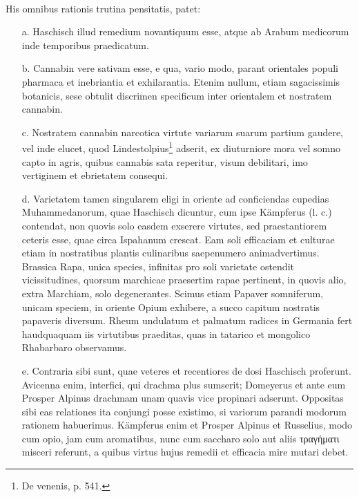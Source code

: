 \documentclass[a4paper, 11pt, oneside, polutonikogreek, german]{article}
\begin{document}
\paragraph{}
His omnibus rationis trutina pensitatis, patet:
\begin{itemize}
    \item[a.] Haschisch illud remedium novantiquum esse, atque ab Arabum medicorum inde temporibus praedicatum.

    \item[b.] Cannabin vere sativam esse, e qua, vario modo, parant orientales populi pharmaca et inebriantia et exhilarantia. Etenim nullum, etiam sagacissimis botanicis, sese obtulit discrimen specificum inter orientalem et nostratem cannabin.

    \item[c.] Nostratem cannabin narcotica virtute variarum suarum partium gaudere, vel inde elucet, quod Lindestolpius\footnote{De venenis, p. 541.} adserit, ex diuturniore mora vel somno capto in agris, quibus cannabis sata reperitur, visum debilitari, imo vertiginem et ebrietatem consequi.

    \item[d.] Varietatem tamen singularem eligi in oriente ad conficiendas cupedias Muhammedanorum, quae Haschisch dicuntur, cum ipse Kämpferus (l. c.) contendat, non quovis solo easdem exserere virtutes, sed praestantiorem ceteris esse, quae circa Ispahanum crescat. Eam soli efficaciam et culturae etiam in nostratibus plantis culinaribus saepenumero animadvertimus. Brassica Rapa, unica species, infinitas pro soli varietate ostendit vicissitudines, quorsum marchicae praesertim rapae pertinent, in quovis alio, extra Marchiam, solo degenerantes. Scimus etiam Papaver somniferum, unicam speciem, in oriente Opium exhibere, a succo capitum nostratis papaveris diversum. Rheum undulatum et palmatum radices in Germania fert haudquaquam iis virtutibus praeditas, quas in tatarico et mongolico Rhabarbaro observamus.

    \item[e.] Contraria sibi sunt, quae veteres et recentiores de dosi Haschisch proferunt. Avicenna enim, interfici, qui drachma plus sumserit; Domeyerus et ante eum Prosper Alpinus drachmam unam quavis vice propinari adserunt. Oppositas sibi eas relationes ita conjungi posse existimo, si variorum parandi modorum rationem habuerimus. Kämpferus enim et Prosper Alpinus et Russelius, modo cum opio, jam cum aromatibus, nunc cum saccharo solo aut aliis τραγήματι misceri referunt, a quibus virtus hujus remedii et efficacia mire mutari debet.
\end{itemize}
\end{document}
